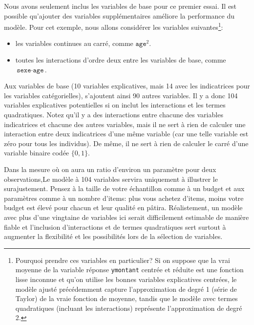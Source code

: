 \documentclass[
  11pt,
  letterpaper,
]{book}
\providecommand{\tightlist}{%
  \setlength{\itemsep}{0pt}\setlength{\parskip}{0pt}}\usepackage{longtable,booktabs,array}
\theoremstyle{definition}
\theoremstyle{remark}
\begin{document}
Nous avons seulement inclus les variables de base pour ce premier essai.
Il est possible qu'ajouter des variables supplémentaires améliore la
performance du modèle. Pour cet exemple, nous allons considérer les
variables suivantes\footnote{Pourquoi prendre ces variables en
  particulier? Si on suppose que la vrai moyenne de la variable réponse
  \texttt{ymontant} centrée et réduite est une fonction lisse inconnue
  et qu'on utilise les bonnes variables explicatives centrées, le modèle
  ajusté précédemment capture l'approximation de degré 1 (série de
  Taylor) de la vraie fonction de moyenne, tandis que le modèle avec
  termes quadratiques (incluant les interactions) représente
  l'approximation de degré 2.}:

\begin{itemize}
\tightlist
\item
  les variables continues au carré, comme \(\texttt{age}^2\).
\item
  toutes les interactions d'ordre deux entre les variables de base,
  comme \(\texttt{sexe}\cdot\texttt{age}\).
\end{itemize}

Aux variables de base (10 variables explicatives, mais 14 avec les
indicatrices pour les variables catégorielles), s'ajoutent ainsi 90
autres variables. Il y a donc 104 variables explicatives potentielles si
on inclut les interactions et les termes quadratiques. Notez qu'il y a
des interactions entre chacune des variables indicatrices et chacune des
autres variables, mais il ne sert à rien de calculer une interaction
entre deux indicatrices d'une même variable (car une telle variable est
zéro pour tous les individus). De même, il ne sert à rien de calculer le
carré d'une variable binaire codée \(\{0, 1\}\).

Dans la mesure où on aura un ratio d'environ un paramètre pour deux
observations,Le modèle à 104 variables servira uniquement à illustrer le
surajustement. Pensez à la taille de votre échantillon comme à un budget
et aux paramètres comme à un nombre d'items: plus vous achetez d'items,
moins votre budget est élevé pour chacun et leur qualité en pâtira.
Réalistement, un modèle avec plus d'une vingtaine de variables ici
serait difficilement estimable de manière fiable et l'inclusion
d'interactions et de termes quadratiques sert surtout à augmenter la
flexibilité et les possibilités lors de la sélection de variables.
\end{document}
